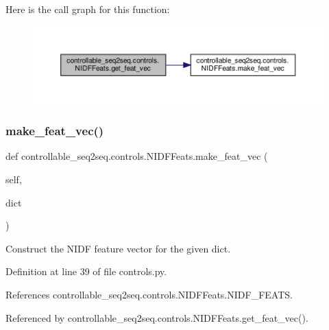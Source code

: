 Here is the call graph for this function\+:
\nopagebreak
\begin{figure}[H]
\begin{center}
\leavevmode
\includegraphics[width=350pt]{classcontrollable__seq2seq_1_1controls_1_1NIDFFeats_a4459af283d40b0a2818ca204a8056029_cgraph}
\end{center}
\end{figure}
\mbox{\label{classcontrollable__seq2seq_1_1controls_1_1NIDFFeats_a3496ec1cf7d5c7284e420585be7767e2}} 
\subsubsection{\texorpdfstring{make\+\_\+feat\+\_\+vec()}{make\_feat\_vec()}}
{\footnotesize\ttfamily def controllable\+\_\+seq2seq.\+controls.\+N\+I\+D\+F\+Feats.\+make\+\_\+feat\+\_\+vec (\begin{DoxyParamCaption}\item[{}]{self,  }\item[{}]{dict }\end{DoxyParamCaption})}

\begin{DoxyVerb}Construct the NIDF feature vector for the given dict.
\end{DoxyVerb}
 

Definition at line 39 of file controls.\+py.



References controllable\+\_\+seq2seq.\+controls.\+N\+I\+D\+F\+Feats.\+N\+I\+D\+F\+\_\+\+F\+E\+A\+TS.



Referenced by controllable\+\_\+seq2seq.\+controls.\+N\+I\+D\+F\+Feats.\+get\+\_\+feat\+\_\+vec().

